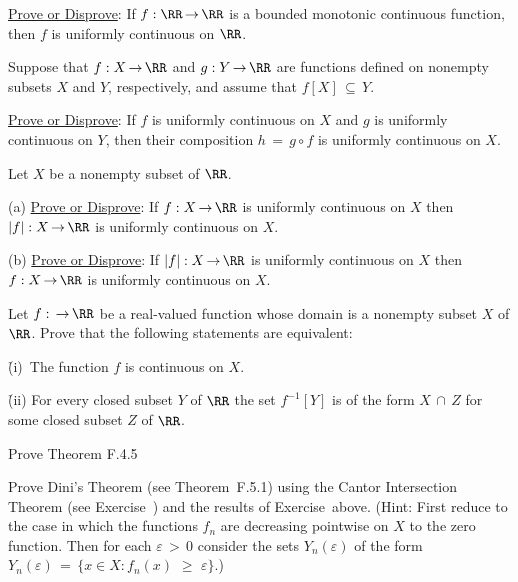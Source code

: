 
\V
\V

\noindent \ExFm \underline{Prove or Disprove}: If $f:{\RR} \,{\rightarrow}\, {\RR}$ is a bounded monotonic continuous function, then $f$ is uniformly continuous on ${\RR}$.

\V
\V

\noindent \ExFn Suppose that $f:X \,{\rightarrow}\, {\RR}$ and $g:Y \,{\rightarrow}\, {\RR}$ are functions defined on nonempty subsets $X$ and $Y$, 
    respectively, and assume that $f[X] \,{\subseteq}\, Y$.

        \underline{Prove or Disprove}: If $f$ is uniformly continuous on $X$ and $g$ is uniformly continuous on $Y$,
    then their composition $h \,=\, g{\circ}f$ is uniformly continuous on $X$.

\V
\V

\noindent \ExFo Let $X$ be a nonempty subset of ${\RR}$.

\V

        (a) \underline{Prove or Disprove}: If $f:X \,{\rightarrow}\, {\RR}$ is uniformly continuous on $X$ then $|f|:X \,{\rightarrow}\, {\RR}$ is uniformly continuous on $X$.

\V

        (b) \underline{Prove or Disprove}: If $|f|:X \,{\rightarrow}\, {\RR}$ is uniformly continuous on $X$ then $f:X \,{\rightarrow}\, {\RR}$ is uniformly continuous on $X$.

\V
\V

\noindent \ExFp Let $f: \,{\rightarrow}\, {\RR}$ be a real-valued function whose domain is a nonempty subset $X$ of ${\RR}$.
    Prove that the following statements are equivalent:

        \h (i)\, The function $f$ is continuous on $X$.

        \h (ii) For every closed subset $Y$ of ${\RR}$ the set $f^{-1}[Y]$ is of the form $X\,{\cap}\,Z$ for some closed subset $Z$ of ${\RR}$.

\V
\V

\noindent \ExFq Prove Theorem F.4.5 %


\V
\V

\noindent \ExFr Prove Dini's Theorem (see Theorem~F.5.1) %
    using the Cantor Intersection Theorem (see Exercise~\ExFf) and the results of Exercise~\ExFp above.
    (Hint: First reduce to the case in which the functions $f_{n}$ are decreasing pointwise on $X$ to the zero function. Then for each ${\varepsilon}\,>\,0$ consider the sets $Y_{n}({\varepsilon})$ of the form $Y_{n}({\varepsilon}) \,=\, \{x{\in}X: f_{n}(x)\,\,{\geq}\,\,{\varepsilon}\}$.)


